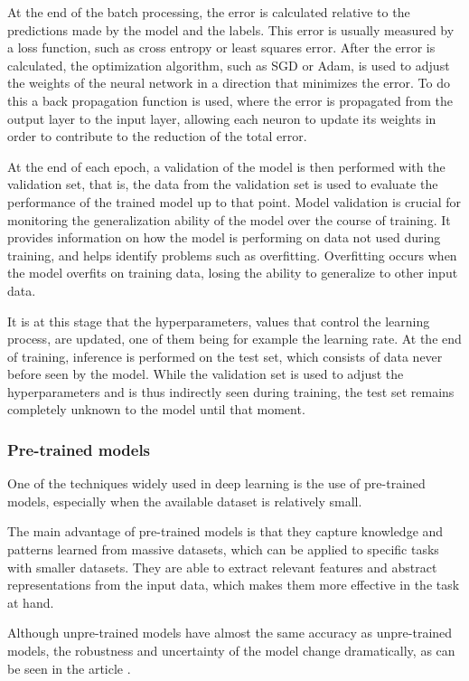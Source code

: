 At the end of the batch processing, the error is calculated relative to the predictions made by the model and the labels. This error is usually measured by a loss function, such as cross entropy or least squares error. After the error is calculated, the optimization algorithm, such as SGD or Adam, is used to adjust the weights of the neural network in a direction that minimizes the error. To do this a back propagation function is used, where the error is propagated from the output layer to the input layer, allowing each neuron to update its weights in order to contribute to the reduction of the total error.

At the end of each epoch, a validation of the model is then performed with the validation set, that is, the data from the validation set is used to evaluate the performance of the trained model up to that point. Model validation is crucial for monitoring the generalization ability of the model over the course of training. It provides information on how the model is performing on data not used during training, and helps identify problems such as overfitting. Overfitting occurs when the model overfits on training data, losing the ability to generalize to other input data.

It is at this stage that the hyperparameters, values that control the learning process, are updated, one of them being for example the learning rate.
At the end of training, inference is performed on the test set, which consists of data never before seen by the model. While the validation set is used to adjust the hyperparameters and is thus indirectly seen during training, the test set remains completely unknown to the model until that moment.

\subsubsection{Pre-trained models}
One of the techniques widely used in deep learning is the use of pre-trained models, especially when the available dataset is relatively small. 

The main advantage of pre-trained models is that they capture knowledge and patterns learned from massive datasets, which can be applied to specific tasks with smaller datasets. They are able to extract relevant features and abstract representations from the input data, which makes them more effective in the task at hand.

Although unpre-trained models have almost the same accuracy as unpre-trained models, the robustness and uncertainty of the model change dramatically, as can be seen in the article \cite{pretrainedmodels}.

